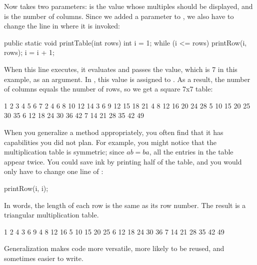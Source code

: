 Now  takes two parameters:  is the value whose multiples should be displayed, and  is the number of columns.
Since we added a parameter to , we also have to change the line in  where it is invoked:

\begin{code}
public static void printTable(int rows) {
    int i = 1;
    while (i <= rows) {
        printRow(i, rows);
        i = i + 1;
    }
}
\end{code}

When this line executes, it evaluates  and passes the value, which is 7 in this example, as an argument.
In , this value is assigned to .
As a result, the number of columns equals the number of rows, so we get a square 7x7 table:

\begin{stdout}
   1   2   3   4   5   6   7
   2   4   6   8  10  12  14
   3   6   9  12  15  18  21
   4   8  12  16  20  24  28
   5  10  15  20  25  30  35
   6  12  18  24  30  36  42
   7  14  21  28  35  42  49
\end{stdout}

When you generalize a method appropriately, you often find that it has capabilities you did not plan.
For example, you might notice that the multiplication table is symmetric; since $ab = ba$, all the entries in the table appear twice.
You could save ink by printing half of the table, and you would only have to change one line of :

\begin{code}
printRow(i, i);
\end{code}

In words, the length of each row is the same as its row number.
The result is a triangular multiplication table.

\begin{stdout}
   1
   2   4
   3   6   9
   4   8  12  16
   5  10  15  20  25
   6  12  18  24  30  36
   7  14  21  28  35  42  49
\end{stdout}

Generalization makes code more versatile, more likely to be reused, and sometimes easier to write.




